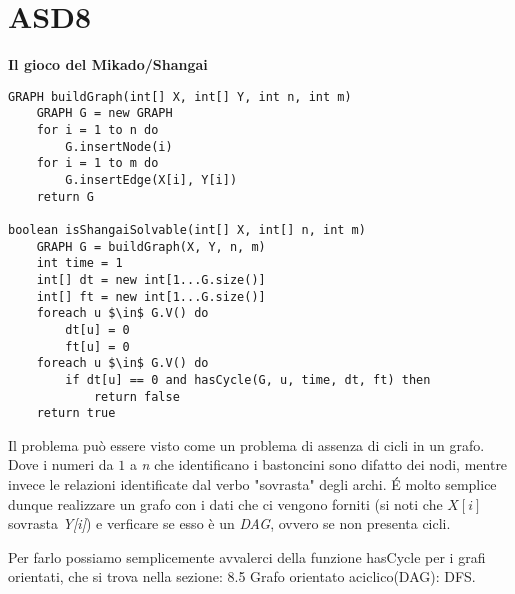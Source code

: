 \documentclass[../cheatSheetAlgoritmi.tex]{subfiles}
\begin{document}
\section{ASD8}
\textbf{Il gioco del Mikado/Shangai}
\begin{lstlisting}[caption=Posso vincere Mikado/Shangai in un unico turno?]
GRAPH buildGraph(int[] X, int[] Y, int n, int m)
	GRAPH G = new GRAPH
  	for i = 1 to n do
    	G.insertNode(i)
  	for i = 1 to m do
    	G.insertEdge(X[i], Y[i])
  	return G

boolean isShangaiSolvable(int[] X, int[] n, int m)
	GRAPH G = buildGraph(X, Y, n, m)
  	int time = 1
  	int[] dt = new int[1...G.size()]
  	int[] ft = new int[1...G.size()]
  	foreach u $\in$ G.V() do
    	dt[u] = 0
    	ft[u] = 0
  	foreach u $\in$ G.V() do
    	if dt[u] == 0 and hasCycle(G, u, time, dt, ft) then
      		return false
  	return true
\end{lstlisting}
Il problema può essere visto come un problema di assenza di cicli in un grafo. Dove i numeri da $1$ a \textit{n} che identificano i bastoncini sono difatto dei nodi, mentre invece le relazioni identificate dal verbo "sovrasta" degli archi. É molto semplice dunque realizzare un grafo con i dati che ci vengono forniti (si noti che $X[i]$ sovrasta \textit{Y[i]}) e verficare se esso è un \textit{DAG}, ovvero se non presenta cicli. 

Per farlo possiamo semplicemente avvalerci della funzione hasCycle per i grafi orientati, che si trova nella sezione: 8.5 Grafo orientato aciclico(DAG): DFS.

\bigskip
\end{document}
